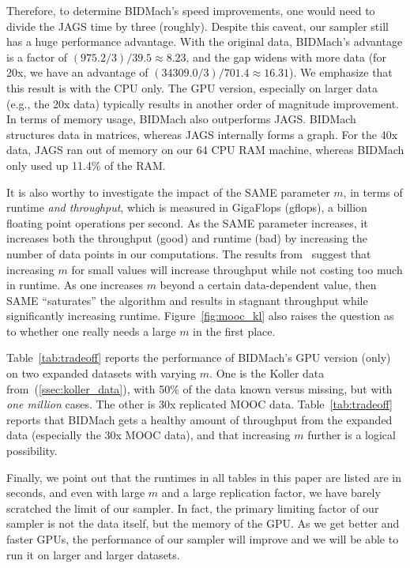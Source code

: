 \documentclass{article} %
\begin{document}
Therefore, to determine BIDMach's speed improvements, one would need to divide the JAGS time by
three (roughly). Despite this caveat, our sampler still has a huge performance advantage. With the
original data, BIDMach's advantage is a factor of $(975.2/3)/39.5 \approx 8.23$, and the gap widens
with more data (for 20x, we have an advantage of $(34309.0/3)/701.4\approx 16.31$). We emphasize
that this result is with the CPU only. The GPU version, especially on larger data (e.g., the 20x
data) typically results in another order of magnitude improvement. In terms of memory usage, BIDMach
also outperforms JAGS. BIDMach structures data in matrices, whereas JAGS internally forms a graph.
For the 40x data, JAGS ran out of memory on our 64 CPU RAM machine, whereas BIDMach only used up
11.4\% of the RAM.

It is also worthy to investigate the impact of the SAME parameter $m$, in terms of runtime \emph{and
throughput}, which is measured in GigaFlops (gflops), a billion floating point operations per
second. As the SAME parameter increases, it increases both the throughput (good) and runtime (bad)
by increasing the number of data points in our computations. The results from~\citep{SAME2015}
suggest that increasing $m$ for small values will increase throughput while not costing too much in
runtime.  As one increases $m$ beyond a certain data-dependent value, then SAME ``saturates'' the
algorithm and results in stagnant throughput while significantly increasing runtime.
Figure~\ref{fig:mooc_kl} also raises the question as to whether one really needs a large $m$ in the
first place.

Table~\ref{tab:tradeoff} reports the performance of BIDMach's GPU version (only) on two expanded
datasets with varying $m$. One is the Koller data from~(\ref{ssec:koller_data}), with 50\% of the
data known versus missing, but with \emph{one million} cases. The other is 30x replicated MOOC data.
Table~\ref{tab:tradeoff} reports that BIDMach gets a healthy amount of throughput from the expanded
data (especially the 30x MOOC data), and that increasing $m$ further is a logical possibility.

Finally, we point out that the runtimes in all tables in this paper are listed are in seconds, and
even with large $m$ and a large replication factor, we have barely scratched the limit of our
sampler. In fact, the primary limiting factor of our sampler is not the data itself, but the memory
of the GPU. As we get better and faster GPUs, the performance of our sampler will improve and we
will be able to run it on larger and larger datasets.
\end{document}
